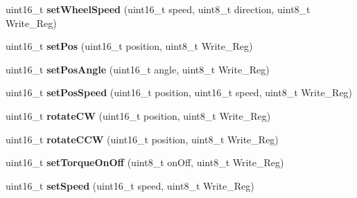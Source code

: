 \begin{DoxyCompactItemize}
\item 
uint16\+\_\+t {\bfseries set\+Wheel\+Speed} (uint16\+\_\+t speed, uint8\+\_\+t direction, uint8\+\_\+t Write\+\_\+\+Reg)\hypertarget{classCytron__G15__Servo_ab2d3a2e8dbc5efe8b930775990f40bfd}{}\label{classCytron__G15__Servo_ab2d3a2e8dbc5efe8b930775990f40bfd}

\item 
uint16\+\_\+t {\bfseries set\+Pos} (uint16\+\_\+t position, uint8\+\_\+t Write\+\_\+\+Reg)\hypertarget{classCytron__G15__Servo_a633d9d0be69a5b322009064b3476a87a}{}\label{classCytron__G15__Servo_a633d9d0be69a5b322009064b3476a87a}

\item 
uint16\+\_\+t {\bfseries set\+Pos\+Angle} (uint16\+\_\+t angle, uint8\+\_\+t Write\+\_\+\+Reg)\hypertarget{classCytron__G15__Servo_afd809206836a6576d14285cee4b35909}{}\label{classCytron__G15__Servo_afd809206836a6576d14285cee4b35909}

\item 
uint16\+\_\+t {\bfseries set\+Pos\+Speed} (uint16\+\_\+t position, uint16\+\_\+t speed, uint8\+\_\+t Write\+\_\+\+Reg)\hypertarget{classCytron__G15__Servo_a9322538f893c36ffad19b5595c9e3604}{}\label{classCytron__G15__Servo_a9322538f893c36ffad19b5595c9e3604}

\item 
uint16\+\_\+t {\bfseries rotate\+CW} (uint16\+\_\+t position, uint8\+\_\+t Write\+\_\+\+Reg)\hypertarget{classCytron__G15__Servo_a98b3da2bc4e6db55600fa8d2d78e2391}{}\label{classCytron__G15__Servo_a98b3da2bc4e6db55600fa8d2d78e2391}

\item 
uint16\+\_\+t {\bfseries rotate\+C\+CW} (uint16\+\_\+t position, uint8\+\_\+t Write\+\_\+\+Reg)\hypertarget{classCytron__G15__Servo_a29861c1d16fb4be69578f75dace85354}{}\label{classCytron__G15__Servo_a29861c1d16fb4be69578f75dace85354}

\item 
uint16\+\_\+t {\bfseries set\+Torque\+On\+Off} (uint8\+\_\+t on\+Off, uint8\+\_\+t Write\+\_\+\+Reg)\hypertarget{classCytron__G15__Servo_a604e958cb901e69e4431e8c3f69c7852}{}\label{classCytron__G15__Servo_a604e958cb901e69e4431e8c3f69c7852}

\item 
uint16\+\_\+t {\bfseries set\+Speed} (uint16\+\_\+t speed, uint8\+\_\+t Write\+\_\+\+Reg)\hypertarget{classCytron__G15__Servo_ab1f468b2537f84a61531648ca8daf9a8}{}\label{classCytron__G15__Servo_ab1f468b2537f84a61531648ca8daf9a8}


\end{DoxyCompactItemize}
